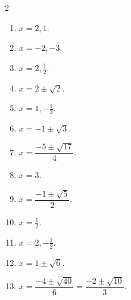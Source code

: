 \documentclass[11pt]{article}
\begin{document}
\begin{keybox}
\begin{multicols}{2}
\small
\begin{enumerate}[leftmargin=*,itemsep=3pt]
  \item $x=2,1$.
  \item $x=-2,-3$.
  \item $x=2,\tfrac12$.
  \item $x=2\pm\sqrt2$.
  \item $x=1,-\tfrac13$.
  \item $x=-1\pm\sqrt3$.
  \item $x=\dfrac{-5\pm\sqrt{17}}{4}$.
  \item $x=3$.
  \item $x=\dfrac{-1\pm\sqrt5}{2}$.
  \item $x=\tfrac12$.
  \item $x=2,-\tfrac12$.
  \item $x=1\pm\sqrt6$.
  \item $x=\dfrac{-4\pm\sqrt{40}}{6}=\dfrac{-2\pm\sqrt{10}}{3}$.
\end{enumerate}
\end{multicols}
\end{keybox}
\end{document}
